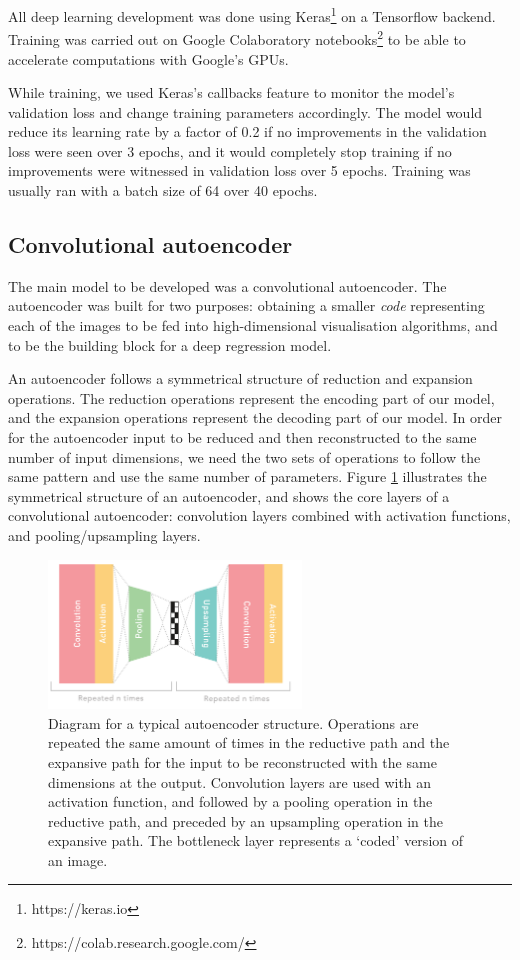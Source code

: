 All deep learning development was done using Keras\footnote{https://keras.io} on a Tensorflow backend. Training was carried out on Google Colaboratory notebooks\footnote{https://colab.research.google.com/} to be able to accelerate computations with Google's GPUs.

While training, we used Keras's callbacks feature to monitor the model's validation loss and change training parameters accordingly. The model would reduce its learning rate by a factor of 0.2 if no improvements in the validation loss were seen over 3 epochs, and it would completely stop training if no improvements were witnessed in validation loss over 5 epochs. Training was usually ran with a batch size of 64 over 40 epochs.

\subsection{Convolutional autoencoder}

The main model to be developed was a convolutional autoencoder. The autoencoder was built for two purposes: obtaining a smaller \textit{code} representing each of the images to be fed into high-dimensional visualisation algorithms, and to be the building block for a deep regression model.

An autoencoder follows a symmetrical structure of reduction and expansion operations. The reduction operations represent the encoding part of our model, and the expansion operations represent the decoding part of our model. In order for the autoencoder input to be reduced and then reconstructed to the same number of input dimensions, we need the two sets of operations to follow the same pattern and use the same number of parameters. Figure \ref{fig:symmstruc} illustrates the symmetrical structure of an autoencoder, and shows the core layers of a convolutional autoencoder: convolution layers combined with activation functions, and pooling/upsampling layers.

\begin{figure}[h!]
    \centering
    \includegraphics[width=0.6\textwidth]{dissertation/figures/autoencoder_repeat_structure.png}
    \caption{Diagram for a typical autoencoder structure. Operations are repeated the same amount of times in the reductive path and the expansive path for the input to be reconstructed with the same dimensions at the output. Convolution layers are used with an activation function, and followed by a pooling operation in the reductive path, and preceded by an upsampling operation in the expansive path. The bottleneck layer represents a `coded' version of an image.}
    \label{fig:symmstruc}
\end{figure}

